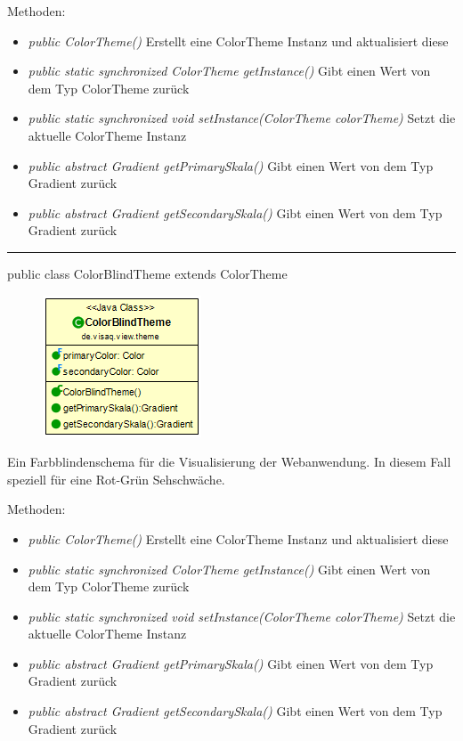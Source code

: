 Methoden:
\begin{itemize}
    \item \emph{public ColorTheme()} Erstellt eine ColorTheme Instanz und aktualisiert diese
    \item \emph{public static synchronized ColorTheme getInstance()} Gibt einen Wert von dem Typ ColorTheme zurück
    \item \emph{public static synchronized void setInstance(ColorTheme colorTheme)} Setzt die aktuelle ColorTheme Instanz    \item \emph{public abstract Gradient getPrimarySkala()} Gibt einen Wert von dem Typ Gradient zurück
    \item \emph{public abstract Gradient getSecondarySkala()}  Gibt einen Wert von dem Typ Gradient zurück
\end{itemize}
\clearpage %
\rule{\textwidth}{0.4pt}
public class ColorBlindTheme extends ColorTheme

\begin{minipage}{0.3\textwidth}
\begin{figure}[H]
    \includegraphics[scale = 0.5]{media/frontend/view/de.view.elements.theme/ColorBlindTheme_Class.png}
\end{figure}
\end{minipage} \hfill
\begin{minipage}{0.6\textwidth}
    Ein Farbblindenschema für die Visualisierung der Webanwendung. In diesem Fall speziell für eine Rot-Grün Sehschwäche.
\end{minipage}

Methoden:
\begin{itemize}
    \item \emph{public ColorTheme()} Erstellt eine ColorTheme Instanz und aktualisiert diese
    \item \emph{public static synchronized ColorTheme getInstance()} Gibt einen Wert von dem Typ ColorTheme zurück
    \item \emph{public static synchronized void setInstance(ColorTheme colorTheme)} Setzt die aktuelle ColorTheme Instanz
    \item \emph{public abstract Gradient getPrimarySkala()} Gibt einen Wert von dem Typ Gradient zurück
    \item \emph{public abstract Gradient getSecondarySkala()}  Gibt einen Wert von dem Typ Gradient zurück
\end{itemize}

